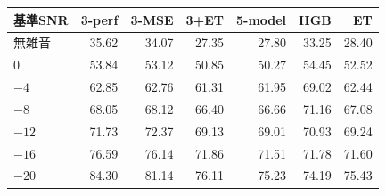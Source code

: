 \begin{tabular}{lrrrrrr}
\toprule
基準SNR & 3-perf & 3-MSE & 3+ET & 5-model & HGB & ET \\
\midrule
無雑音 & 35.62 & 34.07 & 27.35 & 27.80 & 33.25 & 28.40 \\
$0$ & 53.84 & 53.12 & 50.85 & 50.27 & 54.45 & 52.52 \\
$-4$ & 62.85 & 62.76 & 61.31 & 61.95 & 69.02 & 62.44 \\
$-8$ & 68.05 & 68.12 & 66.40 & 66.66 & 71.16 & 67.08 \\
$-12$ & 71.73 & 72.37 & 69.13 & 69.01 & 70.93 & 69.24 \\
$-16$ & 76.59 & 76.14 & 71.86 & 71.51 & 71.78 & 71.60 \\
$-20$ & 84.30 & 81.14 & 76.11 & 75.23 & 74.19 & 75.43 \\
\bottomrule
\end{tabular}
